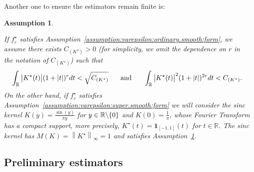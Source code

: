 \documentclass[11pt,a4paper,openany]{article}
\newtheorem{assumption}[thm]{Assumption}
\def\R{\mathbb{R}}
\begin{document}

Another one to ensure the estimators remain finite is:
\begin{assumption} 
\label {assumption:K^star:ordinary.smooth.noise:form}
\em{  
 If $f_{\varepsilon}^{\star}$ satisfies Assumption~\eqref{assumption:varepsilon:ordinary.smooth:form}, we assume there exists $C_{(K^{\star})} > 0$ (for simplicity, we omit the dependence on $r$ in the notation of $C_{(K^{\star})}$) such  that  
\begin{align*}  
	\int_{\R} \big|  K^{\star}(t)  \big| (1 + |t|)^{r}  dt <   \sqrt{ C_{(K^{\star})} }   \hspace{0.5cm}  \textrm{ and } \hspace{0.5cm}  \int_{\R} \big|  K^{\star}(t)  \big|^{2}  (1 + |t|)^{2r}  dt  <  C_{(K^{\star})}   .   
\end{align*}  
On the other hand, if  $f_{\varepsilon}^{\star}$ satisfies Assumption~\eqref{assumption:varepsilon:super.smooth:form}  %
we will consider the sinc kernel $K(y) = \frac{\sin(y)}{\pi y}$ for $y \in \R \char92 \{0\}$ and $K(0) = \frac{1}{\pi}$,  whose Fourier Transform has a compact support, more precisely, $K^{\star}(t) = \mathbf{1}_{[-1, 1]}(t)$  for $t \in \mathbb{R}$. The sinc kernel has  $M(K) = \left\| K^{\star} \right\|_{\infty} = 1$ and satisfies Assumption~\ref{assumption:K^star:ordinary.smooth.noise:form}.      

} \end{assumption}




\subsection{Preliminary estimators}  
\end{document}
